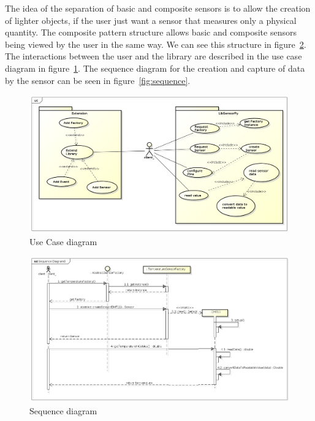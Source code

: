 \documentclass{acm_proc_article-sp}
\begin{document}
The idea of the separation of basic and composite sensors is to allow the creation of lighter objects, if the user just want a sensor that measures only a physical quantity. The composite pattern structure allows basic and composite sensors being viewed by the user in the same way. We can see this structure in figure~\ref{fig:composite}.
\newline
\newline
The interactions between the user and the library are described in the use case diagram  in figure~\ref{fig:useCase}. The sequence diagram for the creation and capture of data by the sensor can be seen in figure~\ref{fig:sequence}.
\begin{figure}[ht]
    \includegraphics[width=1.0\textwidth,natwidth=610,natheight=642]{pictures/UseCaseDiagram.png}
    \caption{Use Case diagram}
    \label{fig:useCase}
\end{figure}

\begin{figure}[t]
    \includegraphics[width=1.0\textwidth,natwidth=610,natheight=642]{pictures/SequenceDiagram.png}
    \caption{Sequence diagram}
    \label{fig:composite}
\end{figure}
\end{document}
